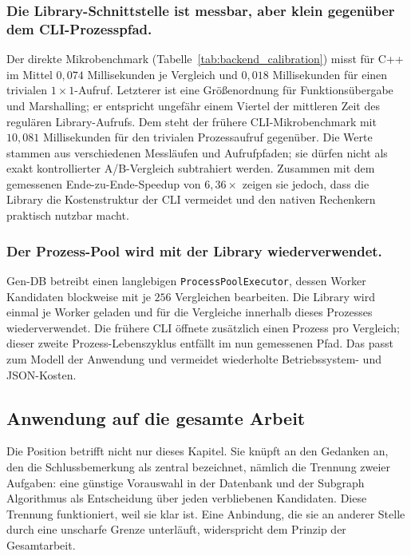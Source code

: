\documentclass[a4paper,12pt, twoside]{report}
\theoremstyle{definition}
\begin{document}
\subsubsection{Die Library-Schnittstelle ist messbar, aber klein gegenüber dem CLI-Prozesspfad.} Der direkte Mikrobenchmark (Tabelle~\ref{tab:backend_calibration}) misst für C++ im Mittel $0{,}074$ Millisekunden je Vergleich und $0{,}018$ Millisekunden für einen trivialen $1\times1$-Aufruf. Letzterer ist eine Größenordnung für Funktionsübergabe und Marshalling; er entspricht ungefähr einem Viertel der mittleren Zeit des regulären Library-Aufrufs. Dem steht der frühere CLI-Mikrobenchmark mit $10{,}081$ Millisekunden für den trivialen Prozessaufruf gegenüber. Die Werte stammen aus verschiedenen Messläufen und Aufrufpfaden; sie dürfen nicht als exakt kontrollierter A/B-Vergleich subtrahiert werden. Zusammen mit dem gemessenen Ende-zu-Ende-Speedup von $6{,}36\times$ zeigen sie jedoch, dass die Library die Kostenstruktur der CLI vermeidet und den nativen Rechenkern praktisch nutzbar macht.

\subsubsection{Der Prozess-Pool wird mit der Library wiederverwendet.} Gen-DB betreibt einen langlebigen \texttt{ProcessPoolExecutor}, dessen Worker Kandidaten blockweise mit je $256$ Vergleichen bearbeiten. Die Library wird einmal je Worker geladen und für die Vergleiche innerhalb dieses Prozesses wiederverwendet. Die frühere CLI öffnete zusätzlich einen Prozess pro Vergleich; dieser zweite Prozess-Lebenszyklus entfällt im nun gemessenen Pfad. Das passt zum Modell der Anwendung und vermeidet wiederholte Betriebssystem- und JSON-Kosten.

\subsection{Anwendung auf die gesamte Arbeit}
\label{sec:fremde_gesamt}

Die Position betrifft nicht nur dieses Kapitel. Sie knüpft an den Gedanken an, den die Schlussbemerkung als zentral bezeichnet, nämlich die Trennung zweier Aufgaben: eine günstige Vorauswahl in der Datenbank und der Subgraph Algorithmus als Entscheidung über jeden verbliebenen Kandidaten. Diese Trennung funktioniert, weil sie klar ist. Eine Anbindung, die sie an anderer Stelle durch eine unscharfe Grenze unterläuft, widerspricht dem Prinzip der Gesamtarbeit.
\end{document}
